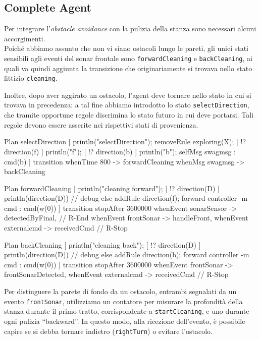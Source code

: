 \documentclass{../llncs}
\newcommand{\codescript}[1]{{\mbox{\small{\texttt{#1}}}}\xspace}
\begin{document}
\subsection{Complete Agent}
Per integrare l'\emph{obstacle avoidance} con la pulizia della stanza sono necessari alcuni accorgimenti.\\

Poiché abbiamo assunto che non vi siano ostacoli lungo le pareti, gli unici stati sensibili agli eventi del sonar frontale sono \codescript{forwardCleaning} e \codescript{backCleaning}, ai quali va quindi aggiunta la transizione che originariamente si trovava nello stato fittizio \codescript{cleaning}.

Inoltre, dopo aver aggirato un ostacolo, l'agent deve tornare nello stato in cui si trovava in precedenza: a tal fine abbiamo introdotto lo stato \codescript{selectDirection}, che tramite opportune regole discrimina lo stato futuro in cui deve portarsi. Tali regole devono essere asserite nei rispettivi stati di provenienza.\\

\begin{qacode}[caption={SoftwareAgent, pt11}]
Plan selectDirection [
	println("selectDirection");
	removeRule exploring(X);
	[ !? direction(f) ] println("f");
	[ !? direction(b) ] { println("b"); selfMsg swagmsg : cmd(b) }
]
transition
	whenTime 800 -> forwardCleaning
	whenMsg swagmsg -> backCleaning
	
Plan forwardCleaning [
	println("cleaning forward");
	[ !? direction(D) ]
		println(direction(D)) // debug
	else
		addRule direction(f);
	forward controller -m cmd : cmd(w(0))
]
transition stopAfter 3600000
	whenEvent sonarSensor -> detectedByFinal, // R-End
	whenEvent frontSonar -> handleFront,
	whenEvent externalcmd -> receivedCmd // R-Stop

Plan backCleaning [
	println("cleaning back");
	[ !? direction(D) ]
		println(direction(D)) // debug
	else
		addRule direction(b);
	forward controller -m cmd : cmd(w(0))
]
transition stopAfter 3600000
	whenEvent frontSonar -> frontSonarDetected,
	whenEvent externalcmd -> receivedCmd // R-Stop
\end{qacode}

Per distinguere la parete di fondo da un ostacolo, entrambi segnalati da un evento \codescript{frontSonar}, utilizziamo un contatore per misurare la profondità della stanza durante il primo tratto, corrispondente a \codescript{startCleaning}, e uno durante ogni pulizia ``backward''. In questo modo, alla ricezione dell'evento, è possibile capire se si debba tornare indietro (\codescript{rightTurn}) o evitare l'ostacolo.\\
\end{document}
